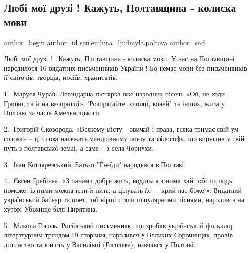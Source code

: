 
 
 
 
 

\subsection{Любі мої друзі ! Кажуть, Полтавщина - колиска мови}
\label{sec:18_01_2023.fb.semenihina_ljudmyla.poltava.1.lyub__mo__druz____ka}

\ifcmt
 author_begin
   author_id semenihina_ljudmyla.poltava
 author_end
\fi

Любі мої друзі ! 💚 Кажуть, Полтавщина - колиска мови. У нас на Полтавщині
народилося 16 видатних письменників України ! Бо немає мови без письменників її
світочів, творців, носіїв, хранителів. 

1. 📗Маруся Чурай. Легендарна піснярка вже народних пісень «Ой, не ходи, Грицю,
та й на вечорниці», "Розпрягайте, хлопці, коней" та інших, жила у Полтаві за
часів Хмельницького.

2. 📙Григорій Сковорода. «Всякому місту – звичай і права, всяка тримає свій ум
голова» – ці слова належать мандрівному поету та філософу, що вирушив у свій
путь з полтавської землі, а саме – з села Чорнухи. 

3.📗 Іван Котляревський. Батько "Енеїди" народився в Полтаві. 

4. 📘Євген Гребінка. «З панами добре жить, водиться з ними хай тобі господь
поможе, із ними можна їсти й пить, а цілувать їх — крий нас боже!». Видатний
український байкар та поет, чиї вірші стали популярними піснями, народився на
хуторі Убіжище біля Пирятина. 

5.📕 Микола Гоголь. Російський письменник, що зробив український фольклор
літературним трендом 19 сторіччя, народився у Великих Сорочинцях, провів
дитинство та юність у Василівці (Гоголеве), навчався у Полтаві. 

